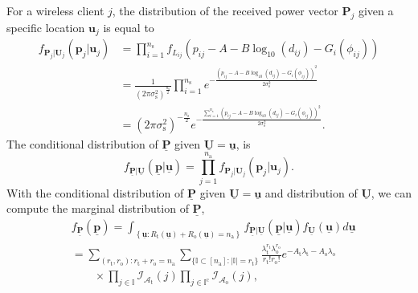 For a wireless client $j$, the distribution of the received power vector $\mathbf{P}_j$ given a specific location $\mathbf{u}_j$ is equal to
\begin{equation} 
\begin{split}
f_{\mathbf{P}_j | \mathbf{U}_j} (\mathbf{p}_{j} | \mathbf{u}_j)
&= \prod_{i=1}^{n_{\mathrm{s}}}
f_{L_{ij}} ( p_{ij} - A - B \log_{10} (d_{ij}) - G_i(\phi_{ij}) ) \\
&= \frac{1}{\left( 2 \pi \sigma_{\mathrm{s}}^2 \right)^{\frac{n_{\mathrm{s}}}{2} }}
\prod_{i=1}^{n_{\mathrm{s}}} e^{- \frac{( p_{ij} - A - B \log_{10} (d_{ij}) - G_i(\phi_{ij}) )^2}{2 \sigma_{\mathrm{s}}^2} } \\
&= \left( 2 \pi \sigma_{\mathrm{s}}^2 \right)^{- \frac{n_{\mathrm{s}}}{2}}
e^{- \frac{ \sum_{i=1}^{n_{\mathrm{s}}}
(p_{ij} - A - B \log_{10} (d_{ij}) - G_i(\phi_{ij}))^2}
{2 \sigma_{\mathrm{s}}^2}} .
\end{split}
\end{equation}
The conditional distribution of $\underline{\mathbf{P}}$ given $\underline{\mathbf{U}}=\underline{\mathbf{u}}$, is
\begin{equation} \label{equation:CondDistP}
f_{\underline{\mathbf{P}} | \underline{\mathbf{U}}}
\left( \underline{\mathbf{p}} | \underline{\mathbf{u}} \right)
= \prod_{j=1}^{n_{\mathrm{a}}}
f_{\mathbf{P}_j | \mathbf{U}_j} (\mathbf{p}_{j}|\mathbf{u}_j)  .
\end{equation}
With the conditional distribution of $\underline{\mathbf{P}}$ given $\underline{\mathbf{U}}=\underline{\mathbf{u}}$ and distribution of $\underline{\mathbf{U}}$, we can compute the marginal distribution of $\underline{\mathbf{P}}$,
\begin{equation*}
\begin{split}
&f_{\underline{\mathbf{P}}} \left( \underline{\mathbf{p}} \right)
= \int_{ \left\{ \underline{\mathbf{u}}
	: R_{\mathrm{t}}(\underline{\mathbf{u}}) 
	+ R_{\mathrm{o}}(\underline{\mathbf{u}}) = n_{\mathrm{a}} \right\} }
f_{\underline{\mathbf{P}} | \underline{\mathbf{U}}}
\left( \underline{\mathbf{p}} | \underline{\mathbf{u}} \right)
f_{\underline{\mathbf{U}}}(\underline{\mathbf{u}})
d\underline{\mathbf{u}} \\
&= \sum_{(r_{\mathrm{t}}, r_{\mathrm{o}}) :
	r_{\mathrm{t}} + r_{\mathrm{o}} = n_{\mathrm{a}}}
\sum_{\{ \mathbb{I} \subset [n_{\mathrm{a}}]
	: |\mathbb{I}| = r_{\mathrm{t}} \}}
\frac{\lambda_{\mathrm{t}}^{r_{\mathrm{t}}}
	\lambda_{\mathrm{o}}^{r_{\mathrm{o}}}}
{r_{\mathrm{t}}! r_{\mathrm{o}}!}
e^{- A_{\mathrm{t}} \lambda_{\mathrm{t}}
	- A_{\mathrm{o}} \lambda_{\mathrm{o}}} \\
&\qquad \times
\prod_{j \in \mathbb{I}} \mathcal{I}_{\mathcal{A}_{\mathrm{t}}}(j)
\prod_{j \in \mathbb{I}^{\mathrm{c}}}
\mathcal{I}_{\mathcal{A}_{\mathrm{o}}}(j) ,
\end{split}
\end{equation*}
